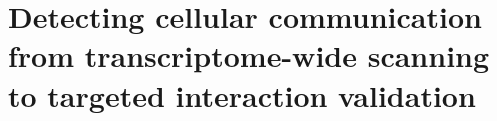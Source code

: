 
\section{Detecting cellular communication from transcriptome-wide scanning to targeted interaction validation}
\label{Sec:2.2_CCC_ST}	%
